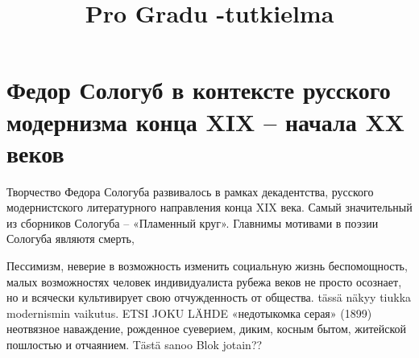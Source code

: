 \documentclass[12pt,a4paper]{article}
\title{Pro Gradu -tutkielma}
\begin{document}


\tableofcontents

\pagebreak


\section{Федор Сологуб в контексте русского модернизма конца XIX -- начала XX веков}

Творчество Федора Сологуба развивалось в рамках декадентства, русского модернистского литературного направления конца XIX века.
Самый значительный из сборников Сологуба – «Пламенный круг».
Главнимы мотивами в поэзии Сологуба являютя смерть,  

Пессимизм, неверие в возможность изменить социальную жизнь
беспомощность, малых возможностях человек
индивидуалиста рубежа веков
 не просто осознает, но и всячески культивирует свою отчужденность от общества.
tässä näkyy tiukka modernismin vaikutus. ETSI JOKU LÄHDE
«недотыкомка серая» (1899)
неотвязное наваждение, рожденное суеверием, диким, косным бытом, житейской пошлостью и отчаянием.   Tästä sanoo Blok jotain??
\end{document}
